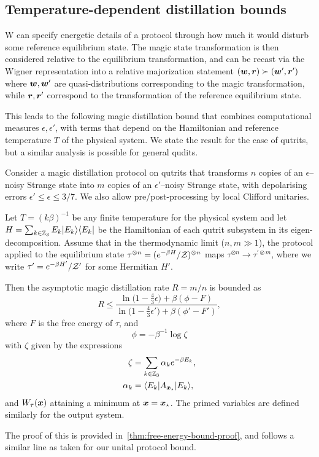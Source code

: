 \documentclass[pra,
aps,
twocolumn,
superscriptaddress,
groupedaddress,
nofootinbib,
reprint
]{revtex4-1}
\begin{document}
\subsection{Temperature-dependent distillation bounds}

W  can specify energetic details of a protocol through how much it would disturb some reference equilibrium state. The magic state transformation is then considered relative to the equilibrium transformation, and can be recast via the Wigner representation into a relative majorization statement $(\boldsymbol{w}, \boldsymbol{r}) \succ (\boldsymbol{w}', \boldsymbol{r}')$ where $\boldsymbol{w}, \boldsymbol{w}'$ are quasi-distributions corresponding to the magic transformation, while $\boldsymbol{r}, \boldsymbol{r}'$ correspond to the transformation of the reference equilibrium state. 

This leads to the following magic distillation bound that combines computational measures $\epsilon,\epsilon'$, with terms that depend on the Hamiltonian and reference temperature $T$ of the physical system. We state the result for the case of qutrits, but a similar analysis is possible for general qudits.

\begin{theorem}\label{thm:free-energy}
	Consider a magic distillation protocol on qutrits that transforms $n$ copies of an $\epsilon$--noisy Strange state into $m$ copies of an $\epsilon'$--noisy Strange state, with depolarising errors $\epsilon' \leq \epsilon \leq 3/7$. We also allow pre/post-processing by local Clifford unitaries.
	
	Let $T =(k\beta)^{-1}$ be any finite temperature for the physical system and let $H= \sum_{k \in \mathbb{Z}_3} E_k |E_k\rangle\langle E_k|$ be the Hamiltonian of each qutrit subsystem in its eigen-decomposition.
Assume that in the thermodynamic limit ($n,m \gg 1$), the protocol applied to the equilibrium state $\tau^{\otimes n} = (e^{-\beta H}/\mathcal{Z})^{\otimes n}$ maps $\tau^{\otimes n} \longrightarrow \tau^{\prime \otimes m}$, where we write $\tau' = e^{-\beta H'}/\mathcal{Z}'$ for some Hermitian $H'$.

Then the asymptotic magic distillation rate $R = m/n$ is bounded as
\begin{equation}\label{eq:rate_bounds_proof}
	R \leq \dfrac{\ln{\big( 1-\frac{4}{3}\epsilon \big)} + \beta (\phi - F)}{\ln{\big( 1-\frac{4}{3}\epsilon' \big)} + \beta (\phi' - F')},
\end{equation}
where $F$ is the free energy of $\tau$,  and 
\begin{equation}
	\phi = -\beta^{-1} \log \zeta
\end{equation}
with $\zeta$ given by the expressions
\begin{align}
	\zeta &= \sum_{k\in \mathbb{Z}_3} \alpha_k e^{-\beta E_k}, \nonumber\\
	\alpha_k &= \langle E_k| A_{\boldsymbol{x}_\star} |E_k\rangle,
\end{align}
and $W_\tau(\boldsymbol{x})$ attaining a minimum at $\boldsymbol{x}=\boldsymbol{x}_\star$. The primed variables are defined similarly for the output system.
\end{theorem}
\noindent The proof of this is provided in~\cref{thm:free-energy-bound-proof}, and follows a similar line as taken for our unital protocol bound.
\end{document}

